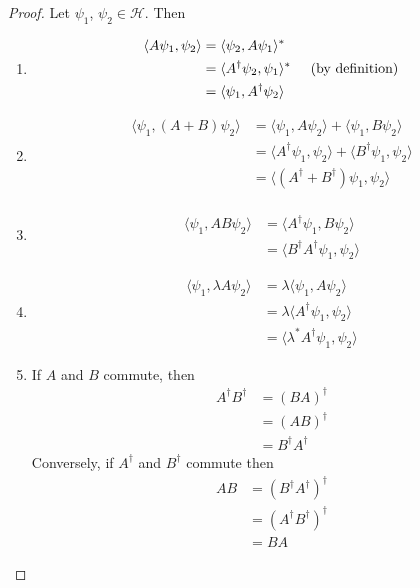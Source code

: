 \documentclass[12pt]{amsart}
\renewcommand{\r}{\rangle}
\renewcommand{\l}{\langle}
\newcommand{\lam}{\lambda}
\newcommand{\MH}{\mathcal{H}}
\begin{document}
\begin{proof} Let $\psi_1$, $\psi_2 \in \MH$. Then
	\begin{enumerate}
		\item 
		\begin{align*}
			\l A \psi_1 , \psi_2 \r
			&= \l \psi_2 , A \psi_1 \r^*\\
			&= \l A^{\dagger}\psi_2 ,  \psi_1 \r^* \hspace{.5cm} \text{(by definition)}\\
			&= \l  \psi_1 , A^{\dagger}\psi_2 \r
		\end{align*}
		\item 
		\begin{align*}
			\l \psi_1 , (A+B) \psi_2 \r 
			&= \l \psi_1 , A \psi_2 \r + \l \psi_1 , B \psi_2 \r \\
			&= \l A^{\dagger} \psi_1 , \psi_2 \r + \l B^{\dagger} \psi_1 , \psi_2 \r \\
			&= \l (A^{\dagger} + B^{\dagger})  \psi_1 , \psi_2 \r  \\
		\end{align*}
		\item 
		\begin{align*}
			\l \psi_1 , AB \psi_2 \r  
			&= \l A^{\dagger}\psi_1 , B \psi_2 \r \\
			&= \l B^{\dagger} A^{\dagger} \psi_1 , \psi_2 \r 
		\end{align*}
		\item 
		\begin{align*}
			\l \psi_1 , \lam A \psi_2 \r 
			&= \lam \l \psi_1 , A \psi_2 \r \\
			&= \lam \l A^{\dagger}\psi_1 , \psi_2 \r \\
			&= \l \lam^* A^{\dagger} \psi_1 , \psi_2 \r 
		\end{align*}
		\item If $A$ and $B$ commute, then 
		\begin{align*}
			A^{\dagger}B^{\dagger}
			&= (BA)^{\dagger} \\
			&= (AB)^{\dagger} \\
			&= B^{\dagger}A^{\dagger}
		\end{align*}
		Conversely, if $A^{\dagger}$ and $B^{\dagger}$ commute then 
		\begin{align*}
			AB
			&= (B^{\dagger}A^{\dagger})^{\dagger} \\
			&= (A^{\dagger}B^{\dagger})^{\dagger} \\
			&= BA
		\end{align*}
	\end{enumerate}
\end{proof}
\end{document}
